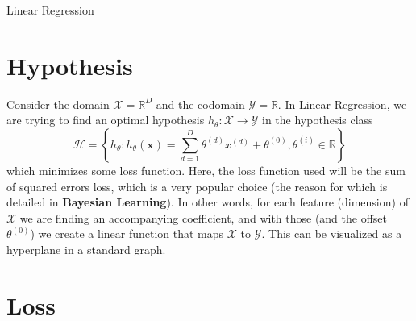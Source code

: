 \documentclass[12pt]{article}
\newcommand{\curly}[1]{\left\{#1\right\}}
\begin{document}
\begin{center}
	\LARGE{Linear Regression}
\end{center}

\section{Hypothesis}

Consider the domain $\mathcal{X} = \mathbb{R}^D$ and the codomain  $\mathcal{Y} = \mathbb{R}$. In Linear Regression, we are trying to find an optimal hypothesis $h_\theta : \mathcal{X} \rightarrow \mathcal{Y}$ in the hypothesis class
\[ \mathcal{H} = \curly{h_\theta : h_\theta(\mathbf{x}) = \sum_{d=1}^D\theta^{(d)}x^{(d)} + \theta^{(0)}, \theta^{(i)} \in \mathbb{R}} \]
which minimizes some loss function. Here, the loss function used will be the sum of squared errors loss, which is a very popular choice (the reason for which is detailed in \textbf{Bayesian Learning}). In other words, for each feature (dimension) of $\mathcal{X}$ we are finding an accompanying coefficient, and with those (and the offset $\theta^{(0)}$) we create a linear function that maps $\mathcal{X}$ to $\mathcal{Y}$. This can be visualized as a hyperplane in a standard graph.

\section{Loss}
\end{document}
